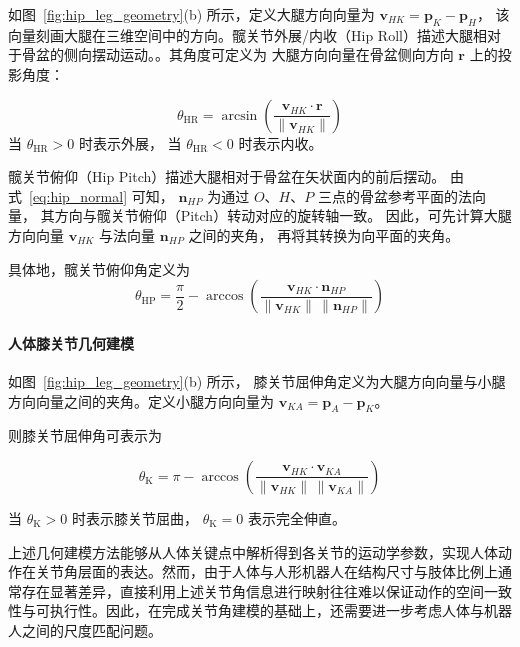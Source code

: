 如图~\ref{fig:hip_leg_geometry}(b) 所示，定义大腿方向向量为 $\mathbf{v}_{HK} = \mathbf{p}_K - \mathbf{p}_H$，
该向量刻画大腿在三维空间中的方向。髋关节外展/内收（Hip Roll）描述大腿相对于骨盆的侧向摆动运动。。其角度可定义为
大腿方向向量在骨盆侧向方向 $\mathbf{r}$ 上的投影角度：

\begin{equation}
	\theta_{\mathrm{HR}}
	=
	\arcsin
	\left(
	\frac{\mathbf{v}_{HK} \cdot \mathbf{r}}
	{\|\mathbf{v}_{HK}\|}
	\right)
	\label{eq:hip_roll}
\end{equation}
当 $\theta_{\mathrm{HR}}>0$ 时表示外展，
当 $\theta_{\mathrm{HR}}<0$ 时表示内收。


髋关节俯仰（Hip Pitch）描述大腿相对于骨盆在矢状面内的前后摆动。
由式~\eqref{eq:hip_normal} 可知，
$\mathbf{n}_{HP}$ 为通过 $O$、$H$、$P$ 三点的骨盆参考平面的法向量，
其方向与髋关节俯仰（Pitch）转动对应的旋转轴一致。
因此，可先计算大腿方向向量
$\mathbf{v}_{HK}$ 与法向量 $\mathbf{n}_{HP}$ 之间的夹角，
再将其转换为向平面的夹角。

具体地，髋关节俯仰角定义为
\begin{equation}
	\theta_{\mathrm{HP}}
	=
	\frac{\pi}{2}
	-
	\arccos
	\left(
	\frac{
		\mathbf{v}_{HK} \cdot \mathbf{n}_{HP}
	}{
		\|\mathbf{v}_{HK}\| \, \|\mathbf{n}_{HP}\|
	}
	\right)
	\label{eq:hip_pitch}
\end{equation}



\paragraph{人体膝关节几何建模}

如图~\ref{fig:hip_leg_geometry}(b) 所示，
膝关节屈伸角定义为大腿方向向量与小腿方向向量之间的夹角。定义小腿方向向量为 $\mathbf{v}_{KA} = \mathbf{p}_A - \mathbf{p}_K$。

则膝关节屈伸角可表示为

\begin{equation}
	\theta_{\mathrm{K}}
	=
	\pi
	-
	\arccos
	\left(
	\frac{
		\mathbf{v}_{HK} \cdot \mathbf{v}_{KA}
	}{
		\|\mathbf{v}_{HK}\| \, \|\mathbf{v}_{KA}\|
	}
	\right)
	\label{eq:knee_angle_final}
\end{equation}

当 $\theta_{\mathrm{K}} > 0$ 时表示膝关节屈曲，
$\theta_{\mathrm{K}} = 0$ 表示完全伸直。

上述几何建模方法能够从人体关键点中解析得到各关节的运动学参数，实现人体动作在关节角层面的表达。然而，由于人体与人形机器人在结构尺寸与肢体比例上通常存在显著差异，直接利用上述关节角信息进行映射往往难以保证动作的空间一致性与可执行性。因此，在完成关节角建模的基础上，还需要进一步考虑人体与机器人之间的尺度匹配问题。


